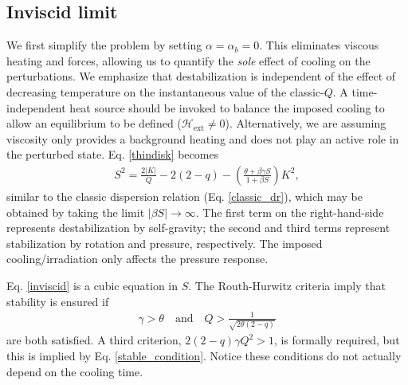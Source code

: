 \subsection{Inviscid limit}\label{2d_inviscid}
We first simplify the problem by setting $\alpha = \alpha_b = 0$. This
eliminates viscous heating and forces, allowing us to quantify the 
\emph{sole} effect of cooling on the 
perturbations. %
We emphasize that destabilization is independent of the effect of decreasing temperature on the instantaneous
value of the classic-$Q$. A time-independent heat source should be
invoked to balance the imposed cooling to allow an equilibrium to be
defined ($\mathcal{H}_\mathrm{ext}\neq 0$). Alternatively, we are
assuming viscosity only provides a background heating and does not
play an active role in the perturbed state. %
Eq. \ref{thindisk} becomes 
\begin{align}\label{inviscid}
  S^2 = \frac{2|K|}{Q} - 2(2-q) - \left(\frac{\theta + \beta \gamma
    S}{1+\beta S}\right)K^2, 
\end{align}
similar to the classic dispersion relation
(Eq. \ref{classic_dr}), which may be obtained by taking the limit
$|\beta S|\to\infty$. %
The first term on the right-hand-side represents destabilization by self-gravity; 
the second and third terms represent stabilization by rotation and
pressure, respectively. The imposed cooling/irradiation only affects the
pressure response. %

Eq. \ref{inviscid} is a cubic equation in $S$. The 
Routh-Hurwitz criteria imply that stability is ensured if 
\begin{align}\label{stable_condition}
  \gamma > \theta \quad \text{and} \quad 
  Q > \frac{1}{\sqrt{2\theta(2-q)}} 
\end{align}
are both satisfied. 
A third criterion, $2(2-q)\gamma Q^2>1$, is formally required, but this
is implied by Eq. \ref{stable_condition}. 
Notice these conditions do not actually depend on the cooling time. 

